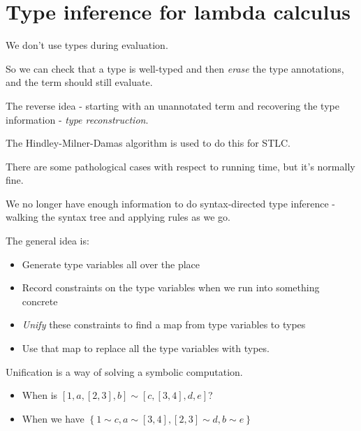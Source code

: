 
\section{Type inference for lambda calculus}

\begin{frame}
  We don't use types during evaluation.
\end{frame}

\begin{frame}
  So we can check that a type is well-typed and then {\it erase} the type
  annotations, and the term should still evaluate.
\end{frame}

\begin{frame}
  The reverse idea - starting with an unannotated term and recovering the type
  information - {\it type reconstruction}.
\end{frame}

\begin{frame}
  The Hindley-Milner-Damas algorithm is used to do this for STLC.
\end{frame}

\begin{frame}
  There are some pathological cases with respect to running time, but it's
  normally fine.
\end{frame}

\begin{frame}
  We no longer have enough information to do syntax-directed type inference -
  walking the syntax tree and applying rules as we go.
\end{frame}

\begin{frame}
  The general idea is:
  \begin{itemize}
  \pause
  \item <+-> Generate type variables all over the place
  \item <+-> Record constraints on the type variables when we run into something concrete
  \item <+-> {\it Unify} these constraints to find a map from type variables to types
  \item <+-> Use that map to replace all the type variables with types.
  \end{itemize}
\end{frame}

\begin{frame}
  Unification is a way of solving a symbolic computation.
  \begin{itemize}
    \pause
  \item<+-> When is $\left[1, a, \left[2,3\right], b\right] \sim \left[c, \left[3, 4\right], d, e\right]$?
  \item<+-> When we have $\left\{ 1 \sim c , a \sim \left[ 3, 4 \right], \left[
        2, 3 \right] \sim d, b \sim e \right\}$
  \end{itemize}
\end{frame}

